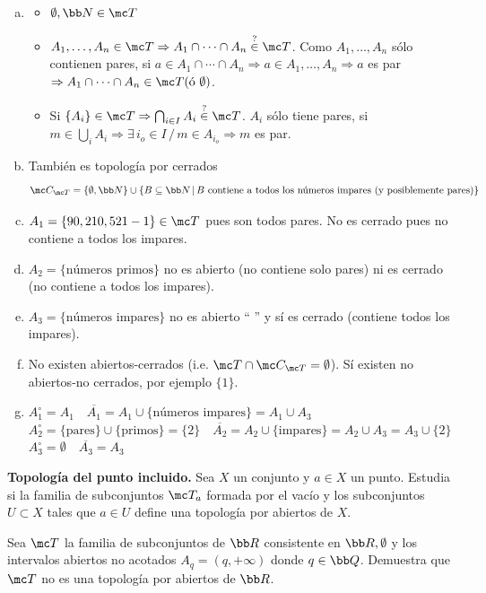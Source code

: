 \begin{sol}
    \begin{enumerate}[a)] \item
        \begin{itemize}
        \item $\emptyset , \bb N \in \mc T$
        \item $A_1, \ldots, A_n \in \mc T \Rightarrow A_1\cap \cdots \cap A_n \overset{?}{\in} \mc T$. Como $A_1, \ldots, A_n$ s\'olo contienen pares, si $a\in A_1\cap \cdots \cap A_n \Rightarrow a \in A_1, \ldots, A_n \Rightarrow a$ es par $\Rightarrow A_1 \cap \cdots \cap A_n \in \mc T (\text{\'o } \emptyset)$.
        \item Si $\{A_i\} \in \mc T \Rightarrow \bigcap_{i \in I} A_i \overset{?}{\in} \mc T$. $A_i$ s\'olo tiene pares, si $m \in \bigcup_i A_i \Rightarrow \exists \, i_o \in I \, / \, m \in A_{i_o} \Rightarrow m $ es par. 
        \end{itemize}
        \item Tambi\'en es topolog\'ia por cerrados
        $$\mc C_{\mc T} = \{\emptyset, \bb N\} \cup \{B \subseteq \bb N \, | \, B \text{ contiene a todos los n\'umeros impares (y posiblemente pares)}\}$$
        \item $A_1 = \{90,210,521 -1\}\in \mc T $ pues son todos pares. No es cerrado pues no contiene a todos los impares.
        \item $A_2 = \{\text{números primos}\}$ no es abierto (no contiene solo pares) ni es cerrado (no contiene a todos los impares).
        \item $A_3 = \{\text{números impares}\}$ no es abierto `` \quad '' y s\'i es cerrado (contiene todos los impares).
        \item No existen abiertos-cerrados (i.e. $\mc T \cap \mc C_{\mc T} =\emptyset$). S\'i existen no abiertos-no cerrados, por ejemplo $\{1\}$.
        \item $A_1^{\circ} = A_1 \quad \overline{A_1} = A_1 \cup \{\text{n\'umeros impares}\} = A_1 \cup A_3$ \\
        $A_2^{\circ} = \{\text{pares}\} \cup \{\text{primos}\} = \{2\} \quad \overline{A_2} = A_2 \cup \{\text{impares}\} = A_2 \cup A_3 = A_3 \cup \{2\}$\\ 
        $A_3 ^{\circ}= \emptyset \quad \overline{A_3} = A_3$
    \end{enumerate}
\end{sol}
\begin{ejer}
    [6] \textbf{Topología del punto incluido.} Sea $X$ un conjunto y $a \in X$ un punto. Estudia si la familia de subconjuntos $\mc T_a$ formada por el vacío y los subconjuntos $U \subset X$ tales que $a \in U$ define una topología por abiertos de $X$.
\end{ejer}
\begin{ejer}
    [9] Sea $\mc T$ la familia de subconjuntos de $\bb R$ consistente en $\bb R, \emptyset$ y los intervalos abiertos no acotados $A_q = (q, +\infty)$ donde $q\in \bb Q$. Demuestra que $\mc T$ no es una topología por abiertos de $\bb R$. 
\end{ejer}
